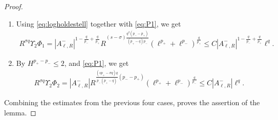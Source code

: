 \documentclass[11pt]{amsart}
\theoremstyle{plain}
\theoremstyle{definition}
\numberwithin{equation}{section}
\begin{document}
\begin{proof}
\begin{enumerate}
\begin{align*}
 \end{align*}
\item 
Using \eqref{eq:logholdestell} together with \eqref{eq:P1}, we get
\begin{align*}
 R^{\sigma q}\Upsilon_2 \Phi_1 =  |A_{\ell, R}^{-}|^{1- \frac{q}{p_{-}} + \frac{q}{p_{+}}} R^{(s-\sigma)\frac{q^2(p_--p_+)}{(p_{+}-q)p_{-}}}  \left(\ell^{p_{+}}+\ell^{p_{-}}\right)^{\frac{q}{p_{+}}} \leq  C|A_{\ell, R}^{-}|^{1- \frac{q}{p_{-}} + \frac{q}{p_{+}}} \ell^q.
\end{align*} 
\item By $H^{p_{+}-p_-}\leq 2$, and \eqref{eq:P1}, we get
\begin{align*}
 R^{\sigma q}\Upsilon_2 \Phi_2 = |A_{\ell, R}^{-}| R^{\frac{(sp_{+}-\sigma q) q}{p_{-}(p_{+}-q)}(p_{-}-p_{+})} \left(\ell^{p_{+}} + \ell^{p_{-}}\right)^{\frac{q}{p_{-}}}  \leq C|A_{\ell, R}^{-}| \ell^q.
\end{align*} 
\end{enumerate}
Combining the estimates from the previous four cases, proves the assertion of the lemma.
\end{proof}
\end{document}
